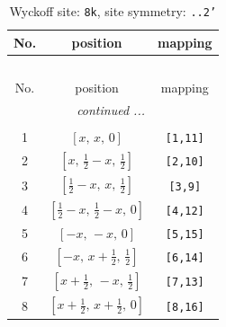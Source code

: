 \documentclass[fleqn,8pt]{jsarticle}
\begin{document}
\begin{longtable}{ccc}
\caption{Wyckoff site: {\tt 8k}, site symmetry: {\tt ..2'}}
 \\
 \hline \hline
No. & position & mapping \\ \hline \endfirsthead

\multicolumn{2}{l}{\tablename\ \thetable{}} \\
 \hline \hline
No. & position & mapping \\ \hline \endhead

 \hline \hline
\multicolumn{2}{r}{\footnotesize\it continued ...} \\ \endfoot

 \hline \hline
\multicolumn{2}{r}{} \\ \endlastfoot

1 & $\left[ x,\, x,\, 0 \right]$ & {\tt [1,11]} \\ \hline
2 & $\left[ x,\, \frac{1}{2} - x,\, \frac{1}{2} \right]$ & {\tt [2,10]} \\ \hline
3 & $\left[ \frac{1}{2} - x,\, x,\, \frac{1}{2} \right]$ & {\tt [3,9]} \\ \hline
4 & $\left[ \frac{1}{2} - x,\, \frac{1}{2} - x,\, 0 \right]$ & {\tt [4,12]} \\ \hline
5 & $\left[ - x,\, - x,\, 0 \right]$ & {\tt [5,15]} \\ \hline
6 & $\left[ - x,\, x + \frac{1}{2},\, \frac{1}{2} \right]$ & {\tt [6,14]} \\ \hline
7 & $\left[ x + \frac{1}{2},\, - x,\, \frac{1}{2} \right]$ & {\tt [7,13]} \\ \hline
8 & $\left[ x + \frac{1}{2},\, x + \frac{1}{2},\, 0 \right]$ & {\tt [8,16]} \\
\end{longtable}
\renewcommand{\arraystretch}{1.2}
\end{document}
